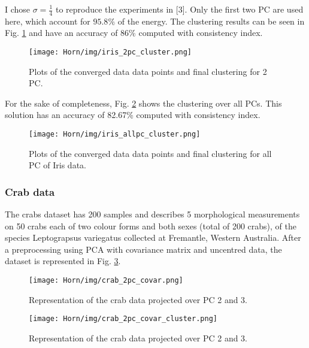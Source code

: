 \documentclass[10pt,a4paper,final]{article}
\begin{document}
I chose $\sigma=\frac{1}{4}$ to reproduce the experiments in [3]. Only the first two PC are used here, which account for $95.8\%$ of the energy. The clustering results can be seen in Fig. \ref{fig:iris_2pc_cluster} and have an accuracy of 86\% computed with consistency index.


\begin{figure}[hbtp]
\centering
\texttt{[image: Horn/img/iris\_2pc\_cluster.png]}
\caption{Plots of the converged data data points and final clustering for 2 PC.}
\label{fig:iris_2pc_cluster}

\end{figure}

For the sake of completeness, Fig. \ref{fig:iris_allpc_cluster} shows the clustering over all PCs. This solution has an accuracy of 82.67\% computed with consistency index.


\begin{figure}[hbtp]
\centering
\texttt{[image: Horn/img/iris\_allpc\_cluster.png]}
\caption{Plots of the converged data data points and final clustering for all PC of Iris data.}
\label{fig:iris_allpc_cluster}
\end{figure}


\subsubsection{Crab data}


The crabs dataset has 200 samples and describes 5 morphological measurements on 50 crabs each of two colour forms and both sexes (total of 200 crabs), of the species Leptograpsus variegatus collected at Fremantle, Western Australia. After a preprocessing using PCA with covariance matrix and uncentred data, the dataset is represented in Fig. \ref{fig:crab_2pc_covar}.%

\begin{figure}[hbtp]
\centering
\texttt{[image: Horn/img/crab\_2pc\_covar.png]}
\caption{Representation of the crab data projected over PC 2 and 3.}
\label{fig:crab_2pc_covar}
\end{figure}

\begin{figure}[hbtp]
\centering
\texttt{[image: Horn/img/crab\_2pc\_covar\_cluster.png]}
\caption{Representation of the crab data projected over PC 2 and 3.}
\label{fig:crab_2pc_covar_cluster}
\end{figure}
\end{document}
